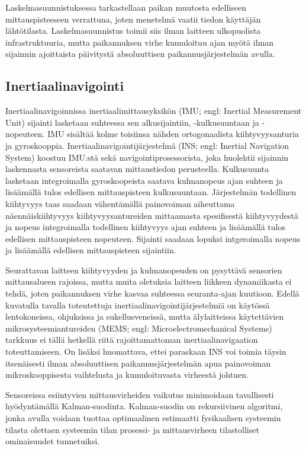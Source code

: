Laskelmasuunnistuksessa tarkastellaan paikan muutosta edelliseen
mittauspisteeseen verrattuna, joten menetelmä vaatii tiedon käyttäjän
lähtötilasta. Laskelmasuunnistus toimii siis ilman laitteen ulkopuolista
infrastruktuuria, mutta paikannuksen virhe kumuloituu ajan myötä ilman
sijainnin ajoittaista päivitystä absoluuttisen paikannusjärjestelmän
avulla.

\subsection{Inertiaalinavigointi}

Inertiaalinavigoinnissa inertiaalimittausyksikön (IMU; engl: Inertial
Measurement Unit) sijainti lasketaan suhteessa sen alkusijaintiin,
-kulkusuuntaan ja -nopeuteen. IMU sisältää kolme toisiinsa nähden
ortogonaalista kiihtyvyysanturia ja gyroskooppia.
Inertiaalinavigointijärjestelmä (INS; engl: Inertial Navigation System) koostuu
IMU:stä sekä navigointiprosessorista, joka huolehtii sijainnin laskennasta
sensoreista saatavan mittaustiedon perusteella. Kulkusuunta lasketaan
integroimalla gyroskoopeista saatava kulmanopeus ajan suhteen ja lisäämällä
tulos edellisen mittauspisteen kulkusuuntaan. Järjestelmän todellinen
kiihtyvyys taas saadaan vähentämällä painovoiman aiheuttama näennäiskiihtyvyys
kiihtyvyysantureiden mittaamasta spesifisestä kiihtyvyydestä ja nopeus
integroimalla todellinen kiihtyvyys ajan suhteen ja lisäämällä tulos edellisen
mittauspisteen nopeuteen. Sijainti saadaan lopuksi intgeroimalla nopeus ja
lisäämällä edellisen mittauspisteen sijaintiin.

Seurattavan laitteen kiihtyvyyden ja kulmanopeuden on pysyttävä sensorien
mittausalueen rajoissa, mutta muita oletuksia laitteen liikkeen dynamiikasta ei
tehdä, joten paikannuksen virhe kasvaa suhteessa seuranta-ajan kuutioon.
Edellä kuvatulla tavalla toteutettuja inertiaalinavigointijärjestelmiä on
käytössä lentokoneissa, ohjuksissa ja sukellusveneissä, mutta älylaitteissa
käytettävien mikrosysteemiantureiden (MEMS; engl: Microelectromechanical
Systems) tarkkuus ei tällä hetkellä riitä rajoittamattoman
inertiaalinavigaation toteuttamiseen. On lisäksi huomattava, ettei
paraskaan INS voi toimia täysin itsenäisesti ilman absoluuttisen
paikannusjärjestelmän apua painovoiman mikroskooppisesta vaihtelusta ja
kumuloituvasta virheestä johtuen.

Sensoreissa esiintyvien mittausvirheiden vaikutus minimoidaan tavallisesti
hyödyntämällä Kalman-suodinta. Kalman-suodin on rekursiivinen algoritmi,
jonka avulla voidaan tuottaa optimaalinen estimaatti fysikaalisen systeemin
tilasta olettaen systeemin tilan prosessi- ja mittausvirheen tilastolliset
ominaisuudet tunnetuiksi.

